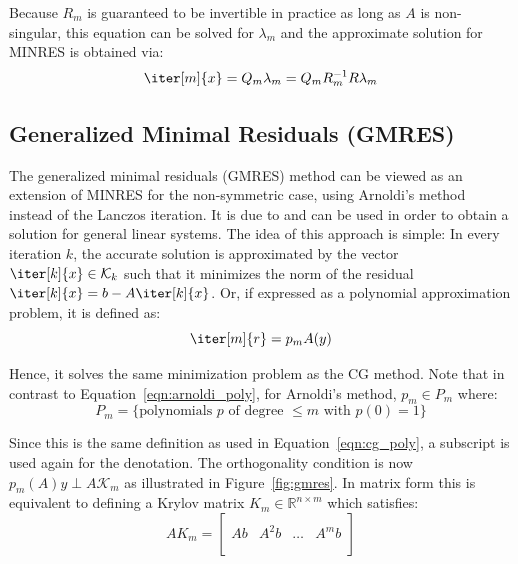 \noindent Because $R_m$ is guaranteed to be invertible in practice as long as $A$ is non-singular, this equation can be solved for $\lambda_m$ and the approximate solution for MINRES is obtained via:
\begin{equation}
    \iter[m]{x} = Q_m\lambda_m=Q_m R_m^{-1}R\lambda_m
\end{equation}



\subsection{Generalized Minimal Residuals (GMRES)}
\label{sec:gmres}

The generalized minimal residuals (GMRES) method can be viewed as an extension of MINRES for the non-symmetric case, using Arnoldi's method instead of the Lanczos iteration. It is due to \cite{saad_gmres_1986} and can be used in order to obtain a solution for general linear systems. The idea of this approach is simple: In every iteration $k$, the accurate solution is approximated by the vector $\iter[k]{x} \in \mathcal{K}_k$ such that it minimizes the norm of the residual $\iter[k]{x}=b-A\iter[k]{x}$. Or, if expressed as a polynomial approximation problem, it is defined as:
\begin{equation}
    \iter[m]{r}=p_mA(y)
\end{equation}

\noindent Hence, it solves the same minimization problem as the CG method. Note that in contrast to Equation~\hyperref[eqn:arnoldi_poly]{\ref{eqn:arnoldi_poly}}, for Arnoldi's method, $p_m \in P_m$ where:
\begin{equation}
    P_m = \{\text{polynomials } p \text{ of degree } \leq m \text{ with }p(0)=1\}
\end{equation}

\noindent Since this is the same definition as used in Equation~\hyperref[eqn:cg_poly]{\ref{eqn:cg_poly}}, a subscript is used again for the denotation. The orthogonality condition is now $p_m(A)y \perp A\mathcal{K}_m$ as illustrated in Figure~\hyperref[fig:gmres]{\ref{fig:gmres}}. In matrix form this is equivalent to defining a Krylov matrix $K_m \in \mathbb{R}^{n \times m}$ which satisfies:
\begin{equation}
\label{eqn:krylov_matrix}
  AK_m =
  \left[
    \begin{array}{c|c|c|c}
      & & & \\
      Ab & A^2b & \dots & A^mb \\
      & & & \\
    \end{array}
  \right] 
\end{equation}

